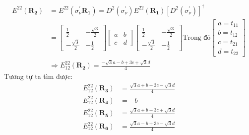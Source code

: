 \documentclass{article}
\begin{document}
\begin{align*}
    E^{22} (\mathbf{R_2}) & = E^{22}(\sigma_\nu^{'} \mathbf{R_1}) = D^2(\sigma^{'}_\nu) E^{22} (\mathbf{R_1}) [D^2(\sigma_\nu ^{'})]^\dagger \\
                          & =
    \begin{bmatrix}
        \frac{1}{2}         & -\frac{\sqrt{3}}{2} \\
        -\frac{\sqrt{3}}{2} & -\frac{1}{2}
    \end{bmatrix} \begin{bmatrix}
                      a & b \\
                      c & d
                  \end{bmatrix}\begin{bmatrix}
                                   \frac{1}{2}         & -\frac{\sqrt{3}}{2} \\
                                   -\frac{\sqrt{3}}{2} & -\frac{1}{2}
                               \end{bmatrix}\text{Trong đó}\begin{bmatrix}
                                                               a = t_{11} \\
                                                               b = t_{12} \\
                                                               c = t_{21} \\
                                                               d = t_{22}
                                                           \end{bmatrix}                                                      \\
                          & \Rightarrow E^{22}_{12} (\mathbf{R_2}) = \frac{-\sqrt{3}a - b + 3c + \sqrt{3}d}{4}
\end{align*}
Tương tự ta tìm được:
\begin{align*}
    E^{22}_{12} (\mathbf{R_3}) & = \frac{\sqrt{3}a + b - 3c - \sqrt{3}d}{4} \\
    E^{22}_{12} (\mathbf{R_4}) & = -b                                       \\
    E^{22}_{12} (\mathbf{R_5}) & = \frac{\sqrt{3}a + b - 3c + \sqrt{3}d}{4} \\
    E^{22}_{12} (\mathbf{R_6}) & = \frac{\sqrt{3}a - b + 3c - \sqrt{3}d}{4} \\
\end{align*}

\clearpage
\end{document}
